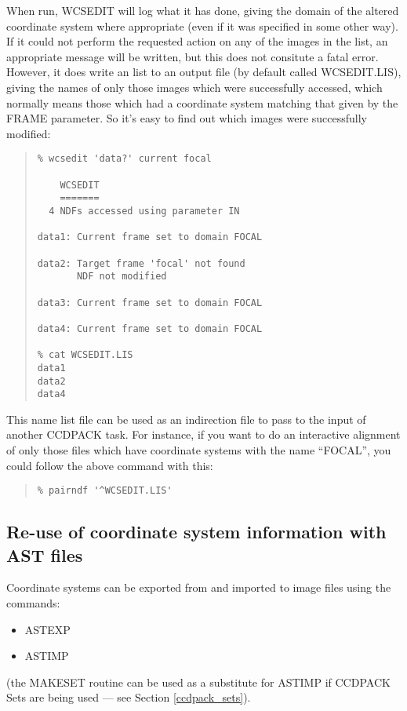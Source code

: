 \documentclass[twoside,11pt]{article}
\newcommand{\htmlref}[2]{#1}
\newcommand{\latexhtml}[2]{#1}
\newcommand{\xlabel}[1]{}
\renewcommand{\_}{\texttt{\symbol{95}}}
\newcommand{\ttsize}{\latexhtml{\small}{}}
\newenvironment{myquote}{\begin{quote}\ttsize}{\end{quote}}
\newcommand{\routine}[1]{{\sc #1}}
\newcommand{\xroutine}[1]{\htmlref{{\sc #1}}{#1}}
\begin{document}
When run, \routine{WCSEDIT} will log what it has done, 
giving the domain of the altered coordinate system where appropriate
(even if it was specified in some other way).
If it could not perform the requested action on any of the images
in the list, an appropriate message will be written, but this
does not consitute a fatal error.
However, it does write an list to an output file (by default called
WCSEDIT.LIS), giving the names of only those images 
which were successfully accessed, which normally
means those which had a coordinate system matching that
given by the FRAME parameter.  So it's easy to find out which 
images were successfully modified:
\begin{myquote}
\begin{verbatim}
% wcsedit 'data?' current focal

    WCSEDIT
    =======
  4 NDFs accessed using parameter IN

data1: Current frame set to domain FOCAL

data2: Target frame 'focal' not found
       NDF not modified

data3: Current frame set to domain FOCAL

data4: Current frame set to domain FOCAL

% cat WCSEDIT.LIS
data1
data2
data4
\end{verbatim}
\end{myquote}
This name list file can be used as an indirection file to pass to the 
input of another CCDPACK task.  For instance, if you want to do an
interactive alignment of only those files which have coordinate
systems with the name ``FOCAL'', you could follow the above command
with this:
\begin{myquote}
\begin{verbatim}
% pairndf '^WCSEDIT.LIS'
\end{verbatim}
\end{myquote}



\subsection{\xlabel{astfiles}\label{astfiles}Re-use of coordinate system
            information with AST files}

Coordinate systems can be exported from and imported to
image files using the commands:
\begin{itemize}
\item \xroutine{ASTEXP}
\item \xroutine{ASTIMP}
\end{itemize}
(the \xroutine{MAKESET} routine can be used as a substitute for
\routine{ASTIMP} if CCDPACK Sets are being used --- 
see Section \ref{ccdpack_sets}).
\end{document}
